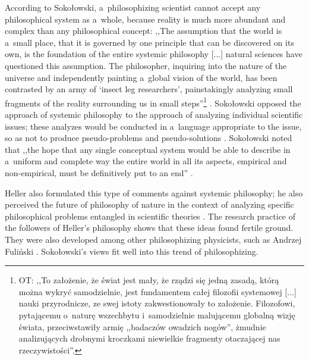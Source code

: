 According to Sokołowski, a~philosophizing scientist cannot accept any philosophical system as a~whole, because reality is much more abundant and complex than any philosophical concept: ,,The assumption that the world is a~small place, that it is governed by one principle that can be discovered on its own, is the foundation of the entire systemic philosophy [...] natural sciences have questioned this assumption. The philosopher, inquiring into the nature of the universe and independently painting a~global vision of the world, has been contrasted by an army of ‘insect leg researchers', painstakingly analyzing small fragments of the reality surrounding us in small steps''\footnote{OT: ,,To założenie, że świat jest mały, że rządzi się jedną zasadą, którą można wykryć samodzielnie, jest fundamentem całej filozofii systemowej [...] nauki przyrodnicze, ze swej istoty zakwestionowały to założenie. Filozofowi, pytającemu o~naturę wszechbytu i~samodzielnie malującemu globalną wizję świata, przeciwstawiły armię ,,badaczów owadzich nogów'', żmudnie analizujących drobnymi kroczkami niewielkie fragmenty otaczającej nas rzeczywistości''.} 
\parencite[][p.45]{}. %
 Sokołowski opposed the approach of systemic philosophy to the approach of analyzing individual scientific issues; these analyzes would be conducted in a~language appropriate to the issue, so as not to produce pseudo-problems and pseudo-solutions 
\parencite[][p.207]{}. %
 Sokołowski noted that ,,the hope that any single conceptual system would be able to describe in a~uniform and complete way the entire world in all its aspects, empirical and non-empirical, must be definitively put to an end'' 
\parencite[][]{}.%




Heller also formulated this type of comments against systemic philosophy; he also perceived the future of philosophy of nature in the context of analyzing specific philosophical problems entangled in scientific theories 
\parencites[][]{Heller1986Jak}[][]{Heller1990Nowa}. %
 The research practice of the followers of Heller's philosophy shows that these ideas found fertile ground. They were also developed among other philosophizing physicists, such as Andrzej Fuliński 
\parencite[][]{Trombik2023Andrzej}. %
 Sokołowski's views fit well into this trend of philosophizing.



